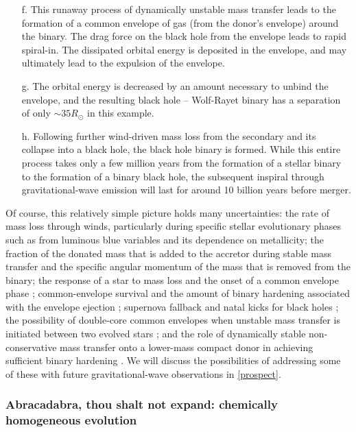 \documentclass[iop,onecolumn]{revtex4}
\begin{document}
\begin{enumerate}
\item[f.] This runaway process of dynamically unstable mass transfer leads to the formation of a common envelope of gas (from the donor's envelope) around the binary.  The drag force on the black hole from the envelope leads to rapid spiral-in.   The dissipated orbital energy is deposited in the envelope, and may ultimately lead to the expulsion of the envelope.  
\item[g.] The orbital energy is decreased by an amount necessary to unbind the envelope, and the resulting black hole -- Wolf-Rayet binary has a separation of only $\sim 35 R_\odot$ in this example.  
\item[h.] Following further wind-driven mass loss from the secondary and its collapse into a black hole, the black hole binary is formed.  While this entire process takes only a few million years from the formation of a stellar binary to the formation of a binary black hole, the subsequent inspiral through gravitational-wave emission will last for around 10 billion years before merger.
\end{enumerate}

Of course, this relatively simple picture holds many uncertainties: the rate of mass loss through winds, particularly during specific stellar evolutionary phases such as from luminous blue variables \citep[massive supergiant stars with significant outbursts and eruptions and associated rapid mass loss,][]{Mennekens:2014}  and its dependence on metallicity; the fraction of the donated mass that is added to the accretor during stable mass transfer and the specific angular momentum of the mass that is removed from the binary; the response of a star to mass loss and the onset of a common envelope phase \citep{Pavlovskii:2017}; common-envelope survival and the amount of binary hardening associated with the envelope ejection \citep[e.g.,][]{Kruckow:2016}; supernova fallback and natal kicks for black holes \citep[e.g.,][]{Repetto:2012,Mandel:2015kicks}; the possibility of double-core common envelopes when unstable mass transfer is initiated between two evolved stars \citep{BetheBrown:1998,Dewi:2006}; and the role of dynamically stable non-conservative mass transfer onto a lower-mass compact donor in achieving sufficient binary hardening  \citep{vandenHeuvel:2017,Neijssel:2018}.  We will discuss the possibilities of addressing some of these with future gravitational-wave observations in \autoref{prospect}.

\subsubsection{Abracadabra, thou shalt not expand: chemically homogeneous evolution}\label{sec:CHE}
\end{document}
